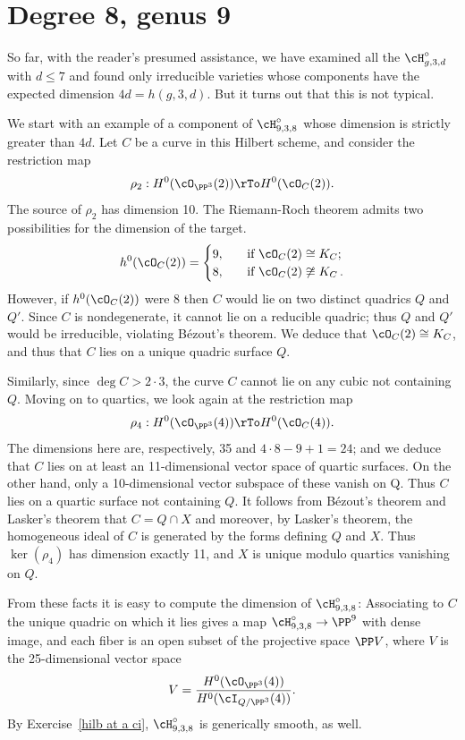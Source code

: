 \section{Degree 8, genus 9}\label{degree 8 section}

So far, with the reader's presumed assistance, we have examined all the $\cH^\circ_{g,3,d}$ with $d\leq 7$
and found only irreducible varieties whose components have the expected dimension $4d = h(g,3,d)$. But it turns out that
this is not typical.

We start with an example of a component of $\cH^\circ_{9,3,8}$ whose dimension is strictly greater than $4d$.  Let $C$ be  a curve in this Hilbert scheme, and consider the restriction map
$$
\rho_2 : H^0(\cO_{\PP^3}(2)) \rTo H^0(\cO_C(2)).
$$
The source of $\rho_2$ has dimension 10. The Riemann-Roch theorem admits two possibilities for the dimension
of the target.
\begin{align*}
h^0(\cO_C(2)) =
\begin{cases}
9, \quad &\text{if } \cO_C(2) \cong K_C; \\
8,  \quad &\text{if } \cO_C(2) \not\cong K_C\,.
\end{cases}
\end{align*}
However, if $h^0(\cO_C(2))$ were 8 then $C$ would  lie on two distinct quadrics $Q$ and $Q'$. Since $C$ is nondegenerate, it cannot lie on a reducible quadric; thus $Q$ and $Q'$ would  be irreducible,  violating B\'ezout's theorem. We deduce that $\cO_C(2) \cong K_C$, and thus that $C$ lies on a unique quadric surface $Q$.

Similarly, since $\deg C > 2\cdot 3$, the curve $C$ cannot lie on any cubic not containing $Q$. Moving on to quartics, we look again at the restriction map
$$
\rho_4 : H^0(\cO_{\PP^3}(4)) \rTo H^0(\cO_C(4)).
$$
The dimensions here are, respectively, 35 and $4\cdot 8 - 9 + 1 = 24$; and we deduce that $C$ lies on at least an 11-dimensional vector space of quartic surfaces. On the other hand, only a 10-dimensional vector subspace of these vanish on Q. Thus $C$ lies on a quartic surface not containing $Q$. It follows from B\'ezout's theorem and 
Lasker's theorem that  $C = Q \cap X$
and moreover, by Lasker's theorem, the homogeneous ideal of $C$ is generated by the forms defining $Q$ and $X$. Thus $\ker(\rho_4)$ has dimension exactly 11, and  $X$ is unique modulo quartics vanishing on $Q$.

From these facts it is easy to compute the dimension of  $\cH^\circ_{9,3,8}$: Associating to $C$ the unique quadric on which it lies gives a map $\cH^\circ_{9,3,8} \to \PP^9$ with dense image, and each fiber is an open subset of the projective space $\PP V$, where $V$ is the 25-dimensional vector space
$$
V = \frac{H^0(\cO_{\PP^3}(4))}{H^0(\cI_{Q/\PP^3}(4))}.
$$
By Exercise~\ref{hilb at a ci}, $\cH^\circ_{9,3,8}$ is generically smooth, as well.

